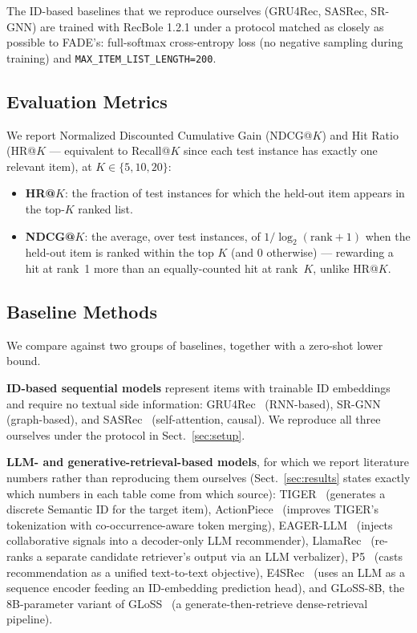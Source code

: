 \documentclass[runningheads]{llncs}
\begin{document}
The ID-based baselines that we reproduce ourselves (GRU4Rec, SASRec, SR-GNN) are trained with RecBole 1.2.1 under a protocol matched as closely as possible to FADE's: full-softmax cross-entropy loss (no negative sampling during training) and \texttt{MAX\_ITEM\_LIST\_LENGTH=200}.

\subsection{Evaluation Metrics}
\label{sec:metrics}
We report Normalized Discounted Cumulative Gain (NDCG@$K$) and Hit Ratio (HR@$K$ --- equivalent to Recall@$K$ since each test instance has exactly one relevant item), at $K \in \{5,10,20\}$:
\begin{itemize}
\item \textbf{HR@$K$}: the fraction of test instances for which the held-out item appears in the top-$K$ ranked list.
\item \textbf{NDCG@$K$}: the average, over test instances, of $1/\log_2(\mathrm{rank}+1)$ when the held-out item is ranked within the top $K$ (and $0$ otherwise) --- rewarding a hit at rank~1 more than an equally-counted hit at rank~$K$, unlike HR@$K$.
\end{itemize}

\subsection{Baseline Methods}
\label{sec:baselines}
We compare against two groups of baselines, together with a zero-shot lower bound.

\textbf{ID-based sequential models} represent items with trainable ID embeddings and require no textual side information: GRU4Rec~\cite{hidasi2016} (RNN-based), SR-GNN~\cite{wu2019} (graph-based), and SASRec~\cite{kang2018} (self-attention, causal). We reproduce all three ourselves under the protocol in Sect.~\ref{sec:setup}.

\textbf{LLM- and generative-retrieval-based models}, for which we report literature numbers rather than reproducing them ourselves (Sect.~\ref{sec:results} states exactly which numbers in each table come from which source): TIGER~\cite{rajput2023} (generates a discrete Semantic ID for the target item), ActionPiece~\cite{hou2025} (improves TIGER's tokenization with co-occurrence-aware token merging), EAGER-LLM~\cite{hong2025} (injects collaborative signals into a decoder-only LLM recommender), LlamaRec~\cite{yue2023} (re-ranks a separate candidate retriever's output via an LLM verbalizer), P5~\cite{geng2022} (casts recommendation as a unified text-to-text objective), E4SRec~\cite{li2024} (uses an LLM as a sequence encoder feeding an ID-embedding prediction head), and GLoSS-8B, the 8B-parameter variant of GLoSS~\cite{acharya2025} (a generate-then-retrieve dense-retrieval pipeline).
\end{document}
